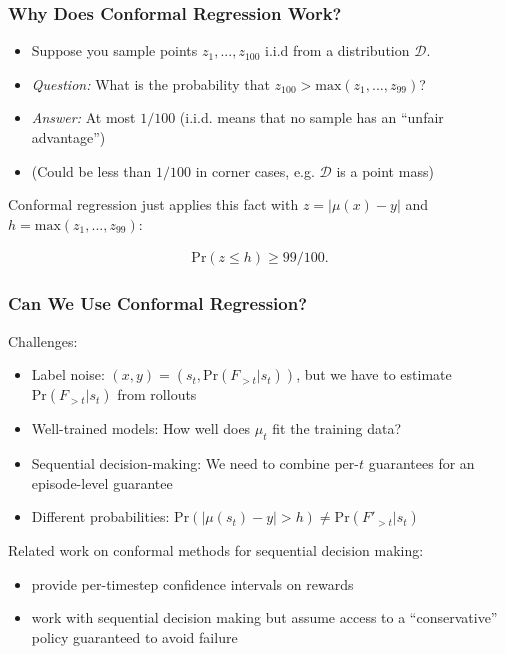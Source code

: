\documentclass[handout]{beamer}
\begin{document}
\begin{frame}
    \frametitle{Why Does Conformal Regression Work?}

    \begin{itemize}
    \item Suppose you sample points $z_1,...,z_{100}$ i.i.d from a distribution $\mathcal{D}$.
    \item\textit{Question:} What is the probability that $z_{100} > \text{max}(z_1,...,z_{99})$?

    \pause

    \item \textit{Answer:} At most $1/100$ (i.i.d. means that no sample has an ``unfair advantage'')
    \item (Could be less than $1/100$ in corner cases, e.g. $\mathcal{D}$ is a point mass)

    \end{itemize}

    \vspace{1em}
    Conformal regression just applies this fact with $z = |\mu(x) - y|$ and $h = \text{max}(z_1,...,z_{99})$:
    
    \begin{align}
    \text{Pr}(z \leq h) \geq 99/100.
    \end{align}

\end{frame}

\begin{frame}
    \frametitle{Can We Use Conformal Regression?}

    Challenges:
    \begin{itemize}
    \item Label noise: $(x,y) = \left(s_t, \text{Pr}(F_{>t}|s_t)\right)$, but we have to estimate $\text{Pr}(F_{>t}|s_t)$ from rollouts
    \item Well-trained models: How well does $\mu_t$ fit the training data?
    \item Sequential decision-making: We need to combine per-$t$ guarantees for an episode-level guarantee
    \item Different probabilities: $\text{Pr}(|\mu(s_t) - y| > h) \ne \text{Pr}(F'_{>t}|s_t)$
    \end{itemize}

    Related work on conformal methods for sequential decision making:
    \begin{itemize}
    \item \cite{dietterich2022conformal} provide per-timestep confidence intervals on rewards
    \item \cite{lekeufack2024conformal} work with sequential decision making but assume access to a ``conservative'' policy guaranteed to avoid failure 
    \end{itemize}

\end{frame}
\end{document}
